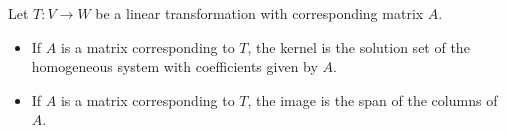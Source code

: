 \begin{applicationActivities}
\begin{observation}
Let $T: V \rightarrow W$ be a linear transformation with corresponding matrix $A$.

\begin{itemize}
\item If $A$ is a matrix corresponding to $T$, the kernel is the solution set of the homogeneous system with coefficients given by $A$.
\item If $A$ is a matrix corresponding to $T$, the image is the span of the columns of $A$.
\end{itemize}
\end{observation}

\end{applicationActivities}
